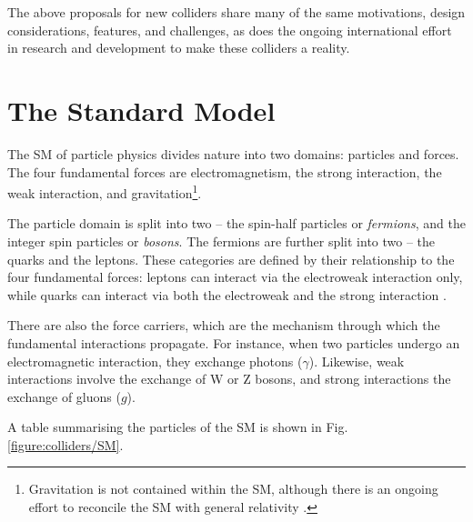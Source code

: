 The above proposals for new colliders share many of the same motivations, design considerations, features, and challenges, as does the ongoing international effort in research and development to make these colliders a reality.

\section{The Standard Model}
The \acrlong{SM} of particle physics divides nature into two domains: particles and forces. The four fundamental forces are electromagnetism, the strong interaction, the weak interaction, and gravitation\footnote{Gravitation is not contained within the \acrshort{SM}, although there is an ongoing effort to reconcile the \acrlong{SM} with general relativity \cite{gravitation-paper}.}. 

The particle domain is split into two -- the spin-half particles or \textit{fermions}, and the integer spin particles or \textit{bosons}. The fermions are further split into two -- the quarks and the leptons. These categories are defined by their relationship to the four fundamental forces: leptons can interact via the electroweak interaction only, while quarks can interact via both the electroweak and the strong interaction \cite{particle-physics-review}.

There are also the force carriers, which are the mechanism through which the fundamental interactions propagate. For instance, when two particles undergo an electromagnetic interaction, they exchange photons ($\gamma$). Likewise, weak interactions involve the exchange of W or Z bosons, and strong interactions the exchange of gluons ($g$). 

A table summarising the particles of the \acrlong{SM} is shown in Fig. \ref{figure:colliders/SM}.


